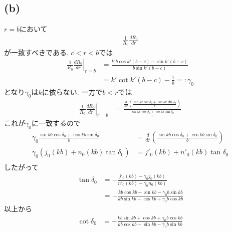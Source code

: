 \documentclass[uplatex,a4j,11pt,dvipdfmx]{jsarticle}
\begin{document}
\subsection*{(b)}
$r=b$において
\begin{align}
  \frac{1}{R_0}\frac{d R_0}{dr}
\end{align}
が一致すべきである.
$c<r<b$では
\begin{align*}
  \left.\frac{1}{R_0}\frac{d R_0}{dr}\right|_{r=b}&=\frac{k'b\cos k'(b-c)-\sin k'(b-c)}{b\sin k'(b-c)}\\
  &=k'\cot k'(b-c)-\frac{1}{b}=:\gamma_0
\end{align*}
となり$\gamma_0$は$k$に依らない.
一方で$b<r$では
\begin{align*}
  \left.\frac{1}{R_0}\frac{d R_0}{dr}\right|_{r=b}&=\frac{\frac{d}{dr}\left(\frac{\sin kr\cos\delta_0+\cos kr\sin\delta_0}{r}\right)}{\frac{\sin kr\cos\delta_0+\cos kr\sin\delta_0}{r}}
\end{align*}
これが$\gamma_0$に一致するので
\begin{align*}
  \gamma_0\frac{\sin kb\cos\delta_0+\cos kb\sin\delta_0}{b}&=\frac{d}{dr}\left(\frac{\sin kb\cos\delta_0+\cos kb\sin\delta_0}{b}\right)\\
  \gamma_0\left(j_0(kb)+n_0(kb)\tan\delta_0\right)&=j'_0(kb)+n'_0(kb)\tan\delta_0\\
\end{align*}
したがって
\begin{align*}
  \tan\delta_0&=-\frac{j'_0(kb)-\gamma_0j_0(kb)}{n'_0(kb)-\gamma_0n_0(kb)}\\
  &=-\frac{kb\cos kb-\sin kb-\gamma_0b\sin kb}{kb\sin kb+\cos kb+\gamma_0b\cos kb}
\end{align*}
以上から
\begin{align}
  \cot\delta_0&=-\frac{kb\sin kb+\cos kb+\gamma_0b\cos kb}{kb\cos kb-\sin kb-\gamma_0b\sin kb}
\end{align}
\end{document}
